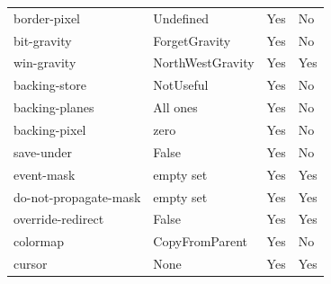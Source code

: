 \documentclass{report}
\begin{document}
\begin{itemize}
\begin{center}
\begin{tabularx}{\textwidth}{@{}XXll@{}}
                    border-pixel &Undefined &Yes &No\\[2ex]
                    bit-gravity &ForgetGravity &Yes &No\\[2ex]
                    win-gravity &NorthWestGravity &Yes &Yes\\[2ex]
                    backing-store &NotUseful &Yes &No\\[2ex]
                    backing-planes& All ones &Yes &No\\[2ex]
                    backing-pixel &zero &Yes &No \\[2ex]
                    save-under &False &Yes &No\\[2ex]
                    event-mask &empty set &Yes &Yes\\[2ex]
                    do-not-propagate-mask &empty set &Yes &Yes\\[2ex]
                    override-redirect &False &Yes &Yes\\[2ex]
                    colormap &CopyFromParent &Yes &No\\[2ex]
                    cursor &None &Yes &Yes \\
                    \bottomrule
                \end{tabularx}
            \end{center}


\end{itemize}
\end{document}
